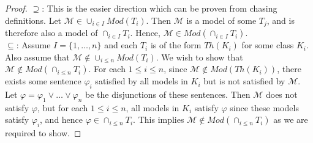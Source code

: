 \documentclass{article}
\begin{document}
\begin{enumerate}
\begin{enumerate}
        \begin{proof}
          $\supseteq$: This is the easier direction which can be proven
          from chasing definitions. Let $\mathcal{M}\in \cup_{i\in
          I}Mod(T_i)$. Then $\mathcal{M}$ is a model of some $T_j$, and is
          therefore also a model of $\cap_{i\in I}T_i$. Hence,
          $\mathcal{M}\in Mod(\cap_{i\in I}T_i)$. \\

          $\subseteq$: Assume $I=\{1,\ldots,n\}$ and each $T_i$ is of the
          form $Th(K_i)$ for some class $K_i$. Also assume that
          $\mathcal{M}\not\in\cup_{i\leq n}Mod(T_i)$. We wish to show that
          $\mathcal{M}\not\in Mod(\cap_{i\leq n}T_i)$. For each $1\leq
          i\leq n$, since $\mathcal{M}\not\in Mod(Th(K_i))$, there exists some
          sentence $\varphi_i$ satisfied by all models in $K_i$ but is not
          satisfied by $\mathcal{M}$. Let
          $\varphi=\varphi_1\vee\ldots\vee\varphi_n$ be the disjunctions
          of these sentences. Then $\mathcal{M}$ does not satisfy
          $\varphi$, but for each $1\leq i\leq n$, all models in $K_i$
          satisfy $\varphi$ since these models satisfy $\varphi_i$, and
          hence $\varphi\in\cap_{i\leq n}T_i$. This implies
          $\mathcal{M}\not\in Mod(\cap_{i\leq n}T_i)$ as we are required to
          show.
        \end{proof}
    \end{enumerate}
\end{enumerate}
\end{document}
